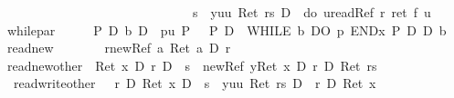 \begin{isabellebody}
\ \ \ \ \ \ \ \ \ \ \ \ \ \ \ \ \ \ \ \ \ \ \ \ \ \ \ \ {\isacharbrackleft}{\isacharhash}\ s\ {\isacharcolon}{\isacharequal}\ y{\isacharbrackright}{\isacharparenleft}{\isasymlambda}uu{\isachardot}\ Ret\ {\isacharparenleft}r{\isasymnoteq}s{\isacharparenright}\ {\isasymlongrightarrow}\isactrlsub D\ {\isasymUp}\ {\isacharparenleft}do\ {\isacharbraceleft}u{\isasymleftarrow}readRef\ r{\isacharsemicolon}\ ret\ {\isacharparenleft}f\ u{\isacharparenright}{\isacharbraceright}{\isacharparenright}{\isacharparenright}{\isachardoublequote}\isanewline
while{\isacharunderscore}par{\isacharcolon}\ \ \ \ \ {\isachardoublequote}{\isasymturnstile}\ P\ {\isasymand}\isactrlsub D\ b\ {\isasymlongrightarrow}\isactrlsub D\ {\isacharbrackleft}{\isacharhash}\ p{\isacharbrackright}{\isacharparenleft}{\isasymlambda}u{\isachardot}\ P{\isacharparenright}\ {\isasymLongrightarrow}\ {\isasymturnstile}\ P\ {\isasymlongrightarrow}\isactrlsub D\ {\isacharbrackleft}{\isacharhash}\ WHILE\ b\ DO\ p\ END{\isacharbrackright}{\isacharparenleft}{\isasymlambda}x{\isachardot}\ P\ {\isasymand}\isactrlsub D\ {\isasymnot}\isactrlsub D\ b{\isacharparenright}{\isachardoublequote}\isanewline
read{\isacharunderscore}new{\isacharcolon}\ \ \ \ \ \ {\isachardoublequote}{\isasymturnstile}\ {\isacharbrackleft}{\isacharhash}\ r{\isasymleftarrow}newRef\ a{\isacharbrackright}{\isacharparenleft}\ Ret\ a\ {\isacharequal}\isactrlsub D\ {\isacharasterisk}r{\isacharparenright}{\isachardoublequote}\isanewline
read{\isacharunderscore}new{\isacharunderscore}other{\isacharcolon}\ {\isachardoublequote}{\isasymturnstile}\ {\isacharparenleft}Ret\ x\ {\isacharequal}\isactrlsub D\ {\isacharasterisk}r{\isacharparenright}\ {\isasymlongrightarrow}\isactrlsub D\ {\isacharbrackleft}{\isacharhash}\ s\ {\isasymleftarrow}\ newRef\ y{\isacharbrackright}{\isacharparenleft}{\isacharparenleft}Ret\ x\ {\isacharequal}\isactrlsub D\ {\isacharasterisk}r{\isacharparenright}\ {\isasymor}\isactrlsub D\ Ret\ {\isacharparenleft}r{\isacharequal}s{\isacharparenright}{\isacharparenright}{\isachardoublequote}\isanewline
\isanewline
\isanewline
\isanewline
\isamarkupfalse%
\ read{\isacharunderscore}write{\isacharunderscore}other{\isacharcolon}\ {\isachardoublequote}{\isasymturnstile}\ {\isacharparenleft}\ {\isacharasterisk}r\ {\isacharequal}\isactrlsub D\ Ret\ x{\isacharparenright}\ {\isasymlongrightarrow}\isactrlsub D\ {\isacharbrackleft}{\isacharhash}\ s\ {\isacharcolon}{\isacharequal}\ y{\isacharbrackright}{\isacharparenleft}{\isasymlambda}uu{\isachardot}\ Ret\ {\isacharparenleft}r{\isasymnoteq}s{\isacharparenright}\ {\isasymlongrightarrow}\isactrlsub D\ {\isacharparenleft}\ {\isacharasterisk}r\ {\isacharequal}\isactrlsub D\ Ret\ x{\isacharparenright}{\isacharparenright}{\isachardoublequote}\isanewline

\end{isabellebody}
